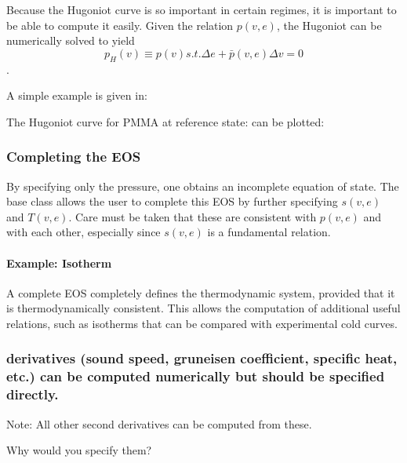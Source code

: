 \documentclass[twocolumn,10pt]{asme2ej}
\begin{document}
Because the Hugoniot curve is so important in certain regimes, it is important to be able to compute it easily. Given the relation $p\left(v,e\right)$, the Hugoniot can be numerically solved to yield 
\[{p_H}\left( v \right) \equiv p\left( v \right)s.t.\Delta e + \bar p\left( {v,e} \right)\Delta v = 0\].

A simple example is given in:


The Hugoniot curve for PMMA at reference state: can be plotted:

\subsubsection{Completing the EOS}
By specifying only the pressure, one obtains an incomplete equation of state. The base class allows the user to complete this EOS by further specifying $s\left(v,e\right)$ and $T\left(v,e\right)$. Care must be taken that these are consistent with $p\left(v,e\right)$ and with each other, especially since $s\left(v,e\right)$ is a fundamental relation.

\paragraph{Example: Isotherm}
A complete EOS completely defines the thermodynamic system, provided that it is thermodynamically consistent. This allows the computation of additional useful relations, such as isotherms that can be compared with experimental cold curves.

\subsubsection{ derivatives (sound speed, gruneisen coefficient, specific heat, etc.) can be computed numerically but should be specified directly.}
Note: All other second derivatives can be computed from these.

Why would you specify them?
\end{document}

